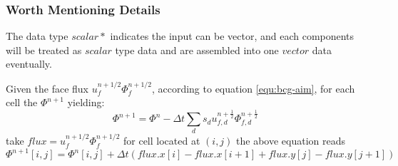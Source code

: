 \subsubsection{Worth Mentioning Details}\label{sec:bcg-direction}
The data type $scalar*$ indicates the input can be vector, and each components will be treated as $scalar$ type data and are assembled into one $vector$ data eventually.\par
Given the face flux $u^{n+1/2}_f \Phi^{n+1/2}_f$, according to equation \ref{equ:bcg-aim}, for each cell the $\Phi^{n+1}$ yielding:
\begin{equation}
    \Phi^{n+1} = \Phi^n-\Delta t \sum_{d} s_d u_{f,d}^{n+ \frac{1}{2}}\Phi_{f,d}^{n + \frac{1}{2}}
\end{equation}
take $flux = u^{n+1/2}_f \Phi^{n+1/2}_f$ for cell located at $(i,j)$ the above equation reads
\begin{equation}
    \Phi^{n+1}[i,j] = \Phi^n[i,j] + \Delta t (flux.x[i] - flux.x[i+1] + flux.y[j] - flux.y[j+1])
\end{equation}

